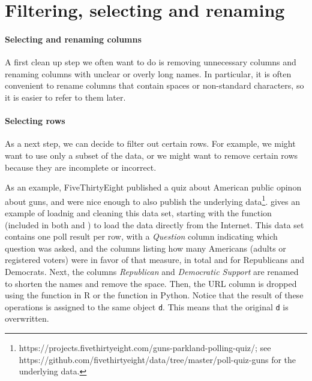 \section{Filtering, selecting and renaming}


\paragraph{Selecting and renaming columns}
A first clean up step we often want to do is removing unnecessary columns and renaming columns with unclear or overly long names.
In particular, it is often convenient to rename columns that contain spaces or non-standard characters, so it is easier to refer to them later.

\paragraph{Selecting rows}
As a next step, we can decide to filter out certain rows.
For example, we might want to use only a subset of the data,
or we might want to remove certain rows because they are incomplete or incorrect.

As an example, FiveThirtyEight published a quiz about American public opinon about guns,
and were nice enough to also publish the underlying data\footnote{https://projects.fivethirtyeight.com/guns-parkland-polling-quiz/; see https://github.com/fivethirtyeight/data/tree/master/poll-quiz-guns for the underlying data.}.
 gives an example of loadnig and cleaning this data set, starting with the function  (included in both  and ) to load the data directly from the Internet.
This data set contains one poll result per row, with a \emph{Question} column indicating which question was asked,
and the columns listing how many Americans (adults or registered voters) were in favor of that measure, in total and for Republicans and Democrats.
Next, the columns \emph{Republican} and \emph{Democratic Support} are renamed to shorten the names and remove the space.
Then, the URL column is dropped using the  function  in R or the  function  in Python.
Notice that the result of these operations is assigned to the same object \texttt{d}.
This means that the original \texttt{d} is overwritten.

  
